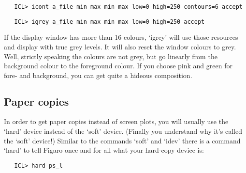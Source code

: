 \begin{verbatim}
   ICL> icont a_file min max min max low=0 high=250 contours=6 accept
\end{verbatim}

\begin{latexonly}
\begin{figure}[htb]
\begin{center}
\leavevmode{}
\end{center}
\end{figure}
\end{latexonly}

\begin{verbatim}
   ICL> igrey a_file min max min max low=0 high=250 accept
\end{verbatim}

\begin{latexonly}
\begin{figure}[htb]
\begin{center}
\leavevmode{}
\end{center}
\end{figure}
\end{latexonly}

   If the display window has more than 16 colours, `igrey' will use
   those resources and display with true grey levels. It will also reset
   the window colours to grey. Well, strictly speaking the colours are
   not grey, but go linearly from the background colour to the
   foreground colour. If you choose pink and green for fore- and
   background, you can get quite a hideous composition.


\subsection{\label{hardcopy}Paper copies}

   In order to get paper copies instead of screen plots, you will
   usually use the `hard' device instead of the `soft' device. (Finally
   you understand why it's called the `soft' device!) Similar to the
   commands `soft' and `idev' there is a command `hard' to tell Figaro
   once and for all what your hard-copy device is:

\begin{verbatim}
   ICL> hard ps_l
\end{verbatim}

